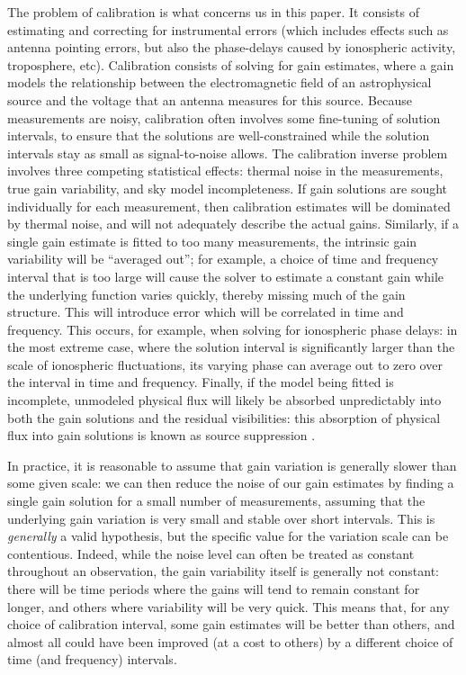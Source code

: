 \pg
The problem of calibration is what concerns us in this paper. It consists of estimating and correcting for instrumental errors (which includes effects such as antenna pointing errors, but also the phase-delays caused by ionospheric activity, troposphere, etc). 
 {Calibration consists of solving for gain estimates, where a gain models the relationship between the electromagnetic field of an astrophysical source and the voltage that an antenna measures for this source. Because measurements are noisy, calibration often involves some fine-tuning of solution intervals, to ensure that the solutions are well-constrained while the solution intervals stay as small as signal-to-noise allows.} The calibration inverse problem involves three competing statistical effects: thermal noise in the measurements, true gain variability, and {sky} model incompleteness. If gain solutions {are sought individually for each measurement}, then calibration estimates will be dominated by thermal noise, and will not adequately describe the actual gains. Similarly, if a single gain estimate is fitted to too many measurements, the intrinsic gain variability will be ``averaged out''; for example, a choice of time and frequency interval that is too large will cause the solver to estimate a constant gain while the underlying function varies quickly, thereby missing much of the gain structure. This will introduce error which will be correlated in time and frequency. This occurs, for example, when solving for ionospheric phase delays: in the most extreme case, where the solution interval is significantly larger than the scale of ionospheric fluctuations, its varying phase can average out to zero over the interval in time and frequency. Finally, if the model being fitted is incomplete, unmodeled physical flux will likely be absorbed unpredictably into both the gain solutions and the residual visibilities: this absorption of physical flux into gain solutions is known as source suppression \citep[see][and references therein]{2014MNRAS.439.4030G,2013MNRAS.435..597K}.

\pg

In practice, it is reasonable to assume that gain variation is generally slower than some given scale: we can then reduce the noise of our gain estimates by finding a single gain solution for a small number of measurements, assuming that the underlying gain variation is very small and stable over short intervals. This is \emph{generally} a valid hypothesis, but the specific value for the variation scale can be contentious. Indeed, while the noise level can often be treated as constant throughout an observation, the gain variability itself is generally not constant: there will be time periods where the gains will tend to remain constant for longer, and others where variability will be very quick. This means that, for any choice of calibration interval, some gain estimates will be better than others, and almost all could have been improved (at a cost to others) by a different choice of time (and frequency) intervals. 


